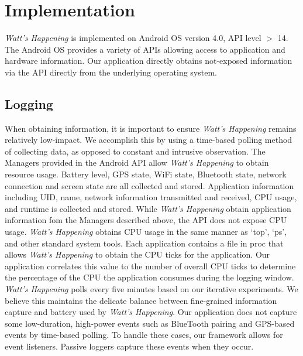 \section{Implementation}
\label{sec:implementation}
\emph{Watt's Happening} is implemented on Android OS version 4.0, API level $>$ 14. 
The Android OS provides a variety of APIs allowing access to application and hardware information.
Our application directly obtains not-exposed information via the API directly from the underlying operating system.

\subsection{Logging}
\label{subsec:impl_logging}
When obtaining information, it is important to ensure \emph{Watt's Happening} remains relatively low-impact.
We accomplish this by using a time-based polling method of collecting data, as opposed to constant and intrusive observation.
The Managers provided in the Android API allow \emph{Watt's Happening} to obtain resource usage.
Battery level, GPS state, WiFi state, Bluetooth state, network connection and screen state are all collected and stored.
Application information including UID, name, network information transmitted and received, CPU usage, and runtime is collected and stored. 
While \emph{Watt's Happening} obtain application information fom the Managers described above, the API does not expose CPU usage.
\emph{Watt's Happening} obtains CPU usage in the same manner as `top', `ps', and other standard system tools.
Each application contains a file in proc that allows \emph{Watt's Happening} to obtain the CPU ticks for the application.
Our application correlates this value to the number of overall CPU ticks to determine the percentage of the CPU the application consumes during the logging window.
\emph{Watt's Happening} polls every five minutes based on our iterative experiments.
We believe this maintains the delicate balance between fine-grained information capture and battery used by \emph{Watt's Happening}.
Our application does not capture some low-duration, high-power events such as BlueTooth pairing and GPS-based events by time-based polling.
To handle these cases, our framework allows for event listeners.
Passive loggers capture these events when they occur.

